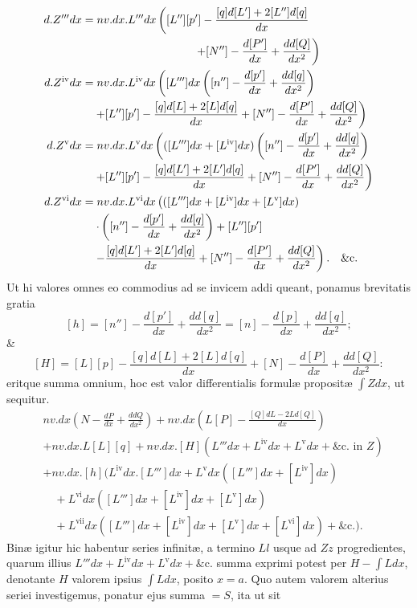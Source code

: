 \[
\begin{aligned}
d.Z'''dx&=nv.dx.L'''dx\left([L''][p']-\frac{[q]d[L']+2[L'']d[q]}{dx}\right.\\
&\hspace{35mm}\left.+[N'']-\frac{d[P']}{dx}+\frac{dd[Q]}{dx^2}\right)\\
d.Z^{\mathrm{iv}}dx&=nv.dx.L^{\mathrm{iv}}dx\left([L''']dx\left([n'']-\frac{d[p']}{dx}+\frac{dd[q]}{dx^2}\right)\right.\\
&\quad\left.+[L''][p']-\frac{[q]d[L]+2[L]d[q]}{dx}+[N'']-\frac{d[P']}{dx}+\frac{dd[Q]}{dx^2}\right)\\
d.Z^{\mathrm{v}}dx&=nv.dx.L^{\mathrm{v}}dx\left(([L''']dx+[L^{\mathrm{iv}}]dx)\left([n'']-\frac{d[p']}{dx}+\frac{dd[q]}{dx^2}\right)\right.\\
&\quad\left.+[L''][p']-\frac{[q]d[L']+2[L']d[q]}{dx}+[N'']-\frac{d[P']}{dx}+\frac{dd[Q]}{dx^2}\right)\\
d.Z^{\mathrm{vi}}dx&=nv.dx.L^{\mathrm{vi}}dx\left(([L''']dx+[L^{\mathrm{iv}}]dx+[L^{\mathrm{v}}]dx)\right.\\
&\quad\left.\cdot\left([n'']-\frac{d[p']}{dx}+\frac{dd[q]}{dx^2}\right)+[L''][p']\right.\\
&\quad\left.-\frac{[q]d[L']+2[L']d[q]}{dx}+[N'']-\frac{d[P']}{dx}+\frac{dd[Q]}{dx^2}\right).\quad\text{\&c.}
\end{aligned}
\]
Ut hi valores omnes eo commodius ad se invicem addi queant, ponamus brevitatis gratia
\[
[h]=[n'']-\frac{d[p']}{dx}+\frac{dd[q]}{dx^2}=[n]-\frac{d[p]}{dx}+\frac{dd[q]}{dx^2};
\]
\&
\[
[H]=[L][p]-\frac{[q]d[L]+2[L]d[q]}{dx}+[N]-\frac{d[P]}{dx}+\frac{dd[Q]}{dx^2}:
\]
eritque summa omnium, hoc est valor differentialis formulæ propositæ $\int Zdx$, ut sequitur.
\[
\begin{aligned}
&nv.dx\left(N-\frac{dP}{dx}+\frac{ddQ}{dx^2}\right)
+nv.dx\left(L[P]-\frac{[Q]dL-2Ld[Q]}{dx}\right)\\
&+nv.dx.L[L][q]+nv.dx.[H](L'''dx+L^{\mathrm{iv}}dx+L^{\mathrm{v}}dx+\text{\&c. in }Z)\\
&+nv.dx.[h]\bigl(L^{\mathrm{iv}}dx.[L''']dx+L^{\mathrm{v}}dx([L''']dx+[L^{\mathrm{iv}}]dx)\\
&\quad+L^{\mathrm{vi}}dx([L''']dx+[L^{\mathrm{iv}}]dx+[L^{\mathrm{v}}]dx)\\
&\quad+L^{\mathrm{vii}}dx([L''']dx+[L^{\mathrm{iv}}]dx+[L^{\mathrm{v}}]dx+[L^{\mathrm{vi}}]dx)+\text{\&c.}\bigr).
\end{aligned}
\]
Binæ igitur hic habentur series infinitæ, a termino $Ll$ usque ad $Zz$ progredientes, quarum illius $L'''dx+L^{\mathrm{iv}}dx+L^{\mathrm{v}}dx+\text{\&c.}$ summa exprimi potest per $H-\int Ldx$, denotante $H$ valorem ipsius $\int Ldx$, posito $x=a$. Quo autem valorem alterius seriei investigemus, ponatur ejus summa $=S$, ita ut sit
